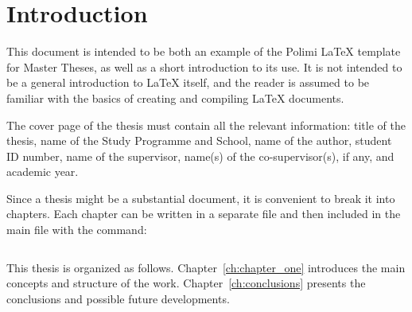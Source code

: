 \chapter*{Introduction}
\label{ch:introduction}

This document is intended to be both an example of the Polimi \LaTeX{} template for Master Theses, as well as a short introduction to its use. It is not intended to be a general introduction to \LaTeX{} itself, and the reader is assumed to be familiar with the basics of creating and compiling \LaTeX{} documents.

The cover page of the thesis must contain all the relevant information: title of the thesis, name of the Study Programme and School, name of the author, student ID number, name of the supervisor, name(s) of the co-supervisor(s), if any, and academic year.

Since a thesis might be a substantial document, it is convenient to break it into chapters. Each chapter can be written in a separate file and then included in the main file with the command:

\begin{verbatim}

\end{verbatim}

This thesis is organized as follows. Chapter~\ref{ch:chapter_one} introduces the main concepts and structure of the work. Chapter~\ref{ch:conclusions} presents the conclusions and possible future developments.